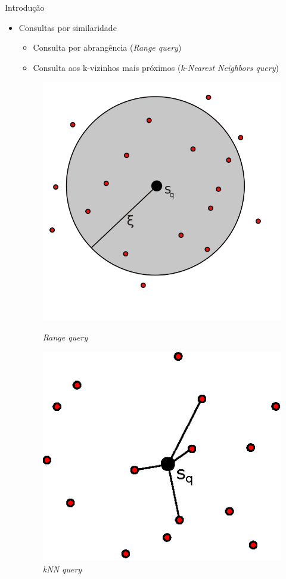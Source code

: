\documentclass{beamer}
\begin{document}
\begin{frame}{Introdução}
  \begin{itemize}
   \item Consultas por similaridade\newline
      \begin{itemize}
	  \item Consulta por abrangência (\textit{Range query})\newline
	  \item Consulta aos k-vizinhos mais próximos (\textit{k-Nearest Neighbors query})
      \end{itemize}
	
	\begin{figure}
\centering
\begin{minipage}{.4\textwidth}
  \centering
  \includegraphics[width=.9\linewidth]{rq.png}
  \caption{\textit{Range query}}
  \label{fig:rq}
\end{minipage}%
\begin{minipage}{.6\textwidth}
  \centering
  \includegraphics[width=.6\linewidth]{knnq.eps}
  \caption{\textit{kNN query}}
  \label{fig:knnq}
\end{minipage}
\end{figure}
	
  \end{itemize}


\end{frame}
\end{document}
